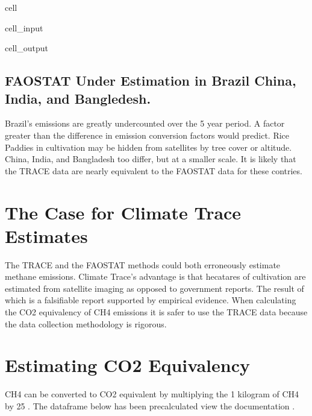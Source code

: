 \documentclass[letterpaper,10pt,english]{jupyterBook}
\begin{document}
\begin{sphinxuseclass}{cell}
\begin{sphinxVerbatimInput}
\begin{sphinxuseclass}{cell_input}
\end{sphinxuseclass}\end{sphinxVerbatimInput}
\begin{sphinxVerbatimOutput}

\begin{sphinxuseclass}{cell_output}
\noindent{}

\end{sphinxuseclass}\end{sphinxVerbatimOutput}

\end{sphinxuseclass}

\subsection{FAOSTAT Under Estimation in Brazil China, India, and Bangledesh.}
\label{\detokenize{notebooks/full_post:faostat-under-estimation-in-brazil-china-india-and-bangledesh}}
\sphinxAtStartPar
Brazil’s emissions are greatly undercounted over the 5 year period. A factor greater than the difference in emission conversion factors would predict.  Rice Paddies in cultivation may be hidden from satellites by tree cover or altitude.   China, India, and Bangladesh too differ, but at a smaller scale. It is likely that the TRACE data are nearly equivalent to the FAOSTAT data for these contries.


\section{The Case for Climate Trace Estimates}
\label{\detokenize{notebooks/full_post:the-case-for-climate-trace-estimates}}
\sphinxAtStartPar
The TRACE and the FAOSTAT methods could both erroneously estimate methane emissions.  Climate Trace’s advantage is that hecatares of cultivation are estimated from satellite imaging as opposed to government reports.  The result of which is a falsifiable report supported by empirical evidence. When calculating the CO2 equivalency of CH4 emissions it is safer to use the TRACE data because the data collection methodology is rigorous.


\section{Estimating CO2 Equivalency}
\label{\detokenize{notebooks/full_post:estimating-co2-equivalency}}
\sphinxAtStartPar
CH4 can be converted to CO2 equivalent by multiplying the 1 kilogram of CH4 by 25 .  The dataframe below has been precalculated view the documentation {\hyperref[\detokenize{notebooks/data_exploration:data-exploration-title}]{}}.
\end{document}
